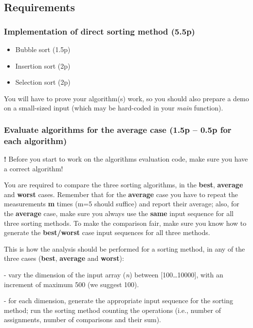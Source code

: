 \documentclass[../en-fa-lab.tex]{subfiles}
\begin{document}
\subsection{Requirements}\label{requirements}

\subsubsection{Implementation of direct sorting method
(5.5p)}\label{implementation-of-direct-sorting-method-5.5p}

\begin{itemize}
\item
  Bubble sort (1.5p)
\item
  Insertion sort (2p)
\item
  Selection sort (2p)
\end{itemize}

You will have to prove your algorithm(s) work, so you should also
prepare a demo on a small-sized input (which may be hard-coded in your
\emph{main} function).

\subsubsection{Evaluate algorithms for the average case (1.5p -- 0.5p for
each
algorithm)}\label{evaluate-algorithms-for-the-average-case-1.5p-0.5p-for-each-algorithm}

\textbf{!} Before you start to work on the algorithms evaluation code,
make sure you have a correct algorithm!

You are required to compare the three sorting algorithms, in the
\textbf{best}, \textbf{average} and \textbf{worst} cases. Remember that
for the \textbf{average} case you have to repeat the measurements
\textbf{m} times (m=5 should suffice) and report their average; also,
for the \textbf{average} case, make sure you always use the
\textbf{same} input sequence for all three sorting methods. To make the
comparison fair, make sure you know how to generate the
\textbf{best/worst} case input sequences for all three methods.

This is how the analysis should be performed for a sorting method, in
any of the three cases (\textbf{best}, \textbf{average} and
\textbf{worst}):

- vary the dimension of the input array (\emph{n}) between
{[}100\ldots10000{]}, with an increment of maximum 500 (we suggest 100).

- for each dimension, generate the appropriate input sequence for the
sorting method; run the sorting method counting the operations (i.e.,
number of assignments, number of comparisons and their sum).
\end{document}
